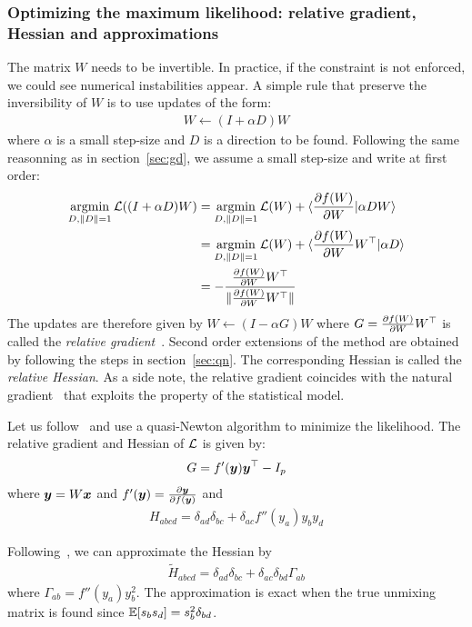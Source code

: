 \subsubsection{Optimizing the maximum likelihood: relative gradient, Hessian and approximations}
\label{sec:opt:likelihood:relativegradient}
The matrix $W$ needs to be invertible. In practice, if the constraint is not
enforced, we could see numerical instabilities appear.
A simple rule that preserve the inversibility of $W$ is to use updates of the
form:
\begin{align}
  W \leftarrow (I + \alpha D)W \label{eq:mult:update}
\end{align}
where $\alpha$ is a small step-size and $D$ is a direction to be found.
Following the same reasonning as in section~\ref{sec:gd}, we assume a small step-size
and write at first order:
\begin{align}
  \argmin_{D, \|D\|=1} \loss((I + \alpha D)W) &= \argmin_{D, \|D\|=1} \loss(W) + \langle \partialfrac{W}{f(W)} | \alpha D W \rangle \\
                                              &= \argmin_{D, \|D\|=1} \loss(W) + \langle \partialfrac{W}{f(W)} W^{\top} | \alpha D \rangle \\
                                              &= -\frac{\partialfrac{W}{f(W)} W^{\top}}{\|\partialfrac{W}{f(W)} W^{\top} \|}
\end{align}
The updates are therefore given by  $W \leftarrow (I - \alpha G)W$ where $G = \partialfrac{W}{f(W)}
  W^{\top}$ is called the \emph{relative
  gradient}~\cite{cardoso1996equivariant}.
Second order extensions of the method are obtained by following the steps in
section~\ref{sec:qn}. The corresponding Hessian is called the \emph{relative
  Hessian}.
As a side note, the relative gradient coincides with the natural
gradient~\cite{amari1999natural} that exploits the property of the statistical model.


Let us follow~\cite{ablin2018faster} and use a quasi-Newton algorithm to minimize the likelihood.
The relative gradient and Hessian of $\loss$ is given by:
\begin{align}
  G = f'(\yb) \yb^{\top} - I_p
\end{align}
where $\yb = W \xb$ and $f'(\yb) = \partialfrac{f(\yb)}{\yb}$
and
\begin{align}
  H_{abcd} =  \delta_{ad}\delta_{bc} + \delta_{ac} f''(y_a)y_by_d
\end{align}

Following~\cite{ablin2018faster}, we can approximate the Hessian by
\begin{align}
  \tilde{H}_{abcd} = \delta_{ad} \delta_{bc} + \delta_{ac} \delta_{bd} \Gamma_{ab}
\end{align}
where $\Gamma_{ab} = f''(y_a) y_b^2$.
The approximation is exact when the true unmixing matrix is found since $\EE[s_b s_d] =  s_b^2\delta_{bd}$.

